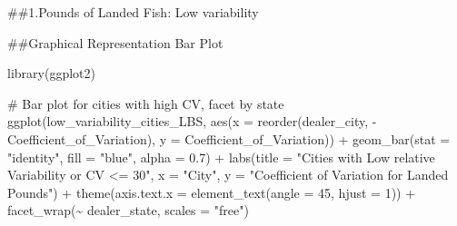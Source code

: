 \documentclass[
  letterpaper,
  DIV=11,
  numbers=noendperiod]{scrartcl}
\newenvironment{Shaded}{\begin{snugshade}}{\end{snugshade}}
\newcommand{\AttributeTok}[1]{\textcolor[rgb]{0.40,0.45,0.13}{#1}}
\newcommand{\CommentTok}[1]{\textcolor[rgb]{0.37,0.37,0.37}{#1}}
\newcommand{\ConstantTok}[1]{\textcolor[rgb]{0.56,0.35,0.01}{#1}}
\newcommand{\DecValTok}[1]{\textcolor[rgb]{0.68,0.00,0.00}{#1}}
\newcommand{\FloatTok}[1]{\textcolor[rgb]{0.68,0.00,0.00}{#1}}
\newcommand{\FunctionTok}[1]{\textcolor[rgb]{0.28,0.35,0.67}{#1}}
\newcommand{\NormalTok}[1]{\textcolor[rgb]{0.00,0.23,0.31}{#1}}
\newcommand{\OtherTok}[1]{\textcolor[rgb]{0.00,0.23,0.31}{#1}}
\newcommand{\SpecialCharTok}[1]{\textcolor[rgb]{0.37,0.37,0.37}{#1}}
\newcommand{\StringTok}[1]{\textcolor[rgb]{0.13,0.47,0.30}{#1}}
\begin{document}
\#\#1.Pounds of Landed Fish: Low variability

\begin{Shaded}
\end{Shaded}

\#\#Graphical Representation Bar Plot

\begin{Shaded}
\begin{Highlighting}[]
\FunctionTok{library}\NormalTok{(ggplot2)}

\CommentTok{\# Bar plot for cities with high CV, facet by state}
\FunctionTok{ggplot}\NormalTok{(low\_variability\_cities\_LBS, }\FunctionTok{aes}\NormalTok{(}\AttributeTok{x =} \FunctionTok{reorder}\NormalTok{(dealer\_city, }\SpecialCharTok{{-}}\NormalTok{Coefficient\_of\_Variation), }\AttributeTok{y =}\NormalTok{ Coefficient\_of\_Variation)) }\SpecialCharTok{+}
  \FunctionTok{geom\_bar}\NormalTok{(}\AttributeTok{stat =} \StringTok{"identity"}\NormalTok{, }\AttributeTok{fill =} \StringTok{"blue"}\NormalTok{, }\AttributeTok{alpha =} \FloatTok{0.7}\NormalTok{) }\SpecialCharTok{+}
  \FunctionTok{labs}\NormalTok{(}\AttributeTok{title =} \StringTok{"Cities with Low relative Variability or CV \textless{}= 30"}\NormalTok{, }\AttributeTok{x =} \StringTok{"City"}\NormalTok{, }\AttributeTok{y =} \StringTok{"Coefficient of Variation for Landed Pounds"}\NormalTok{) }\SpecialCharTok{+}
  \FunctionTok{theme}\NormalTok{(}\AttributeTok{axis.text.x =} \FunctionTok{element\_text}\NormalTok{(}\AttributeTok{angle =} \DecValTok{45}\NormalTok{, }\AttributeTok{hjust =} \DecValTok{1}\NormalTok{)) }\SpecialCharTok{+}
  \FunctionTok{facet\_wrap}\NormalTok{(}\SpecialCharTok{\textasciitilde{}}\NormalTok{ dealer\_state, }\AttributeTok{scales =} \StringTok{"free"}\NormalTok{)}
\end{Highlighting}
\end{Shaded}
\end{document}
